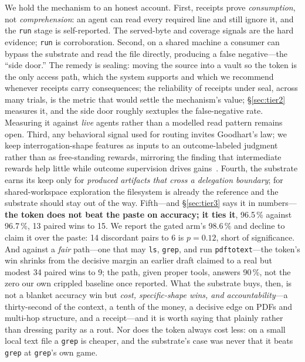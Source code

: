 \documentclass[10pt,twocolumn]{article}
\newcommand{\tok}[1]{\texttt{#1}}
\begin{document}
We hold the mechanism to an honest account. First, receipts prove
\emph{consumption}, not \emph{comprehension}: an agent can read every
required line and still ignore it, and the \tok{run} stage is
self-reported. The served-byte and coverage signals are the hard evidence;
\tok{run} is corroboration. Second, on a shared machine a consumer can
bypass the substrate and read the file directly, producing a false
negative---the ``side door.'' The remedy is sealing: moving the source
into a vault so the token is the only access path, which the system
supports and which we recommend whenever receipts carry consequences; the
reliability of receipts under seal, across many trials, is the metric that
would settle the mechanism's value; \S\ref{sec:tier2} measures it, and the
side door roughly sextuples the false-negative rate. Measuring it against
\emph{live} agents rather than a modelled read pattern remains open.
Third, any behavioral signal used for routing invites Goodhart's law; we
keep interrogation-shape features as inputs to an outcome-labeled judgment
rather than as free-standing rewards, mirroring the finding that
intermediate rewards help little while outcome supervision
drives gains~\citep{jin2025}. Fourth, the substrate earns its keep only for
\emph{produced artifacts that cross a delegation boundary}; for
shared-workspace exploration the filesystem is already the reference and
the substrate should stay out of the way. Fifth---and \S\ref{sec:tier3} says it
in numbers---\textbf{the token does not beat the paste on accuracy; it ties
it}, 96.5\,\% against 96.7\,\%, 13 paired wins to 15. We report the gated arm's
98.6\,\% and decline to claim it over the paste: 14 discordant pairs to 6 is
$p=0.12$, short of significance. And against a \emph{fair} path---one that may
\texttt{ls}, \texttt{grep}, and run \texttt{pdftotext}---the token's win shrinks
from the decisive margin an earlier draft claimed to a real but modest 34 paired
wins to 9; the path, given proper tools, answers 90\,\%, not the zero our own
crippled baseline once reported. What the substrate buys, then, is not a blanket
accuracy win but \emph{cost, specific-shape wins, and accountability}---a
thirty-second of the context, a tenth of the money, a decisive edge on PDFs and
multi-hop structure, and a receipt---and it is worth saying that plainly rather
than dressing parity as a rout. Nor does the token always cost less: on a small
local text file a \tok{grep} is cheaper, and the substrate's case was never that
it beats \tok{grep} at \tok{grep}'s own game.
\end{document}
